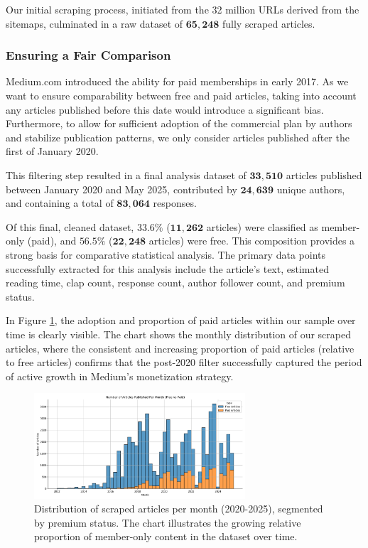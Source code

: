 \documentclass[11pt,a4paper]{article}
\begin{document}
Our initial scraping process, initiated from the 32 million URLs derived from the sitemaps, culminated in a raw dataset of $\mathbf{65,248}$ fully scraped articles.

\subsubsection*{Ensuring a Fair Comparison}

Medium.com introduced the ability for paid memberships in early 2017. As we want to ensure comparability between free and paid articles, taking into account any articles published before this date would introduce a significant bias. Furthermore, to allow for sufficient adoption of the commercial plan by authors and stabilize publication patterns, we only consider articles published after the first of January 2020.

This filtering step resulted in a final analysis dataset of $\mathbf{33,510}$ articles published between January 2020 and May 2025, contributed by $\mathbf{24,639}$ unique authors, and containing a total of $\mathbf{83,064}$ responses.

Of this final, cleaned dataset, $\mathbf{33.6\%}$ ($\mathbf{11,262}$ articles) were classified as member-only (paid), and $\mathbf{56.5\%}$ ($\mathbf{22,248}$ articles) were free. This composition provides a strong basis for comparative statistical analysis. The primary data points successfully extracted for this analysis include the article's text, estimated reading time, clap count, response count, author follower count, and premium status.

In Figure {\ref{fig:articles_per_month}}, the adoption and proportion of paid articles within our sample over time is clearly visible. The chart shows the monthly distribution of our scraped articles, where the consistent and increasing proportion of paid articles (relative to free articles) confirms that the post-2020 filter successfully captured the period of active growth in Medium's monetization strategy.

\begin{figure}[H]
    \centering
    \includegraphics[width=0.7\textwidth]{images/articles_per_month.png}
    \caption{Distribution of scraped articles per month (2020-2025), segmented by premium status. The chart illustrates the growing relative proportion of member-only content in the dataset over time.}
    \label{fig:articles_per_month}
\end{figure}
\end{document}
